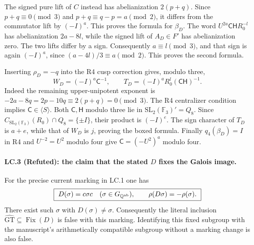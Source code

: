 The signed pure lift of $C$ instead has abelianization $2(p+q)$.
Since $p+q\equiv0\pmod3$ and
$p+q\equiv q-p=a\pmod2$, it differs from the commutator lift by
$(-I)^a$. This proves the formula for $\beta_D$. The word
$U^{2a}\mathsf C\mathsf H R_0^{-l}$ has abelianization
$2a-8l$, while the signed lift of $A_D\in F'$ has abelianization
zero. The two lifts differ by a sign. Consequently
$a\equiv l\pmod3$, and that sign is again $(-I)^a$, since
$(a-4l)/3\equiv a\pmod2$. This proves the second formula.

Inserting $\rho_D=-q$ into the R4 cusp correction gives, modulo
three,
\[
 W_D=(-I)^a\mathsf C^{-1},\qquad
 T_D=(-I)^aR_0^l(\mathsf C\mathsf H)^{-1}.
\]
Indeed the remaining upper-unipotent exponent is
$-2a-8q=2p-10q\equiv2(p+q)=0\pmod3$.
The R4 centralizer condition implies $\mathsf C\in\langle S\rangle$.
Both $\mathsf C,\mathsf H$ modulo three lie in
$\mathrm{SL}_2(\mathbb F_3)'=Q_8$. Since
$C_{\mathrm{SL}_2(\mathbb F_3)}(R_0)\cap Q_8=\{\pm I\}$,
their product is $(-I)^e$. The sign character of $T_D$ is $a+e$,
while that of $W_D$ is $j$, proving the boxed formula. Finally
$q_4(\beta_D)=I$ in R4 and $U^{-2}=U^2$ modulo four give
$\mathsf C=(-U^2)^a$ modulo four.

\paragraph{LC.3 (Refuted): the claim that the stated $D$ fixes the Galois image.}
For the precise current marking in LC.1 one has
\[
 \boxed{\ D(\sigma)=c\sigma c
       \quad(\sigma\in G_{\mathbb Q^{\rm ab}}),\qquad
       \rho(D\sigma)=-\rho(\sigma).\ }
\]
There exist such $\sigma$ with $D(\sigma)\ne\sigma$.
Consequently the literal inclusion
$\widehat{\mathrm{GT}}\subseteq\operatorname{Fix}(D)$ is false
with this marking. Identifying this fixed subgroup with the manuscript's
arithmetically compatible subgroup without a marking change is also
false.

